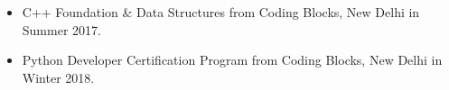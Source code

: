 \documentclass{article}
\begin{document}
	\LARGE
		\begin{itemize}
			\color{black}	\item C++ Foundation \& Data Structures from Coding Blocks, New Delhi in Summer 2017.
			\color{black}	\item Python Developer Certification Program from Coding Blocks, New Delhi in Winter 2018.
		\end{itemize}
				
%			
%				
	
\end{document}
